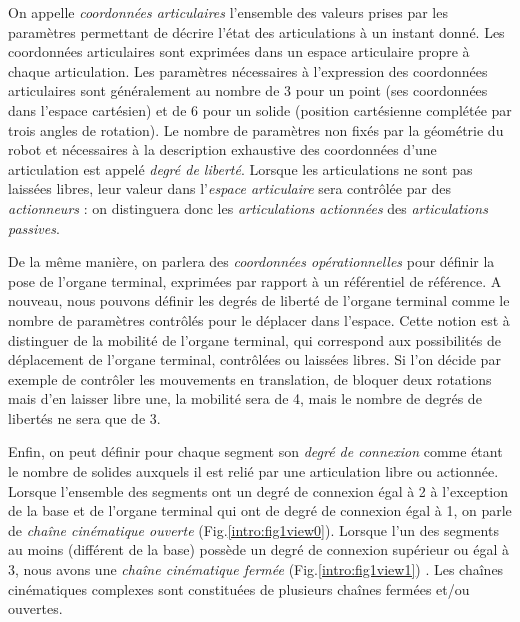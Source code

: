 On appelle {\it coordonnées articulaires} l'ensemble des valeurs prises par les paramètres permettant de décrire l'état des articulations à un instant donné. Les coordonnées articulaires sont exprimées dans un espace articulaire propre à chaque articulation. Les paramètres nécessaires à l'expression des coordonnées articulaires sont généralement au nombre de 3 pour un point (ses coordonnées dans l'espace cartésien) et de 6 pour un solide (position cartésienne complétée par trois angles de rotation). Le nombre de paramètres non fixés par la géométrie du robot et nécessaires à la description exhaustive des coordonnées d'une articulation est appelé {\it degré de liberté}. Lorsque les articulations ne sont pas laissées libres, leur valeur dans l'{\it espace articulaire} sera contr\^olée par des {\it actionneurs} : on distinguera donc les {\it articulations actionnées} des {\it articulations passives}.

De la même manière, on parlera des {\it coordonnées opérationnelles} pour définir la pose de l'organe terminal, exprimées par rapport à un référentiel de référence. A nouveau, nous pouvons définir les degrés de liberté de l'organe terminal comme le nombre de paramètres contr\^olés pour le déplacer dans l'espace. Cette notion est à distinguer de la mobilité de l'organe terminal, qui correspond aux possibilités de déplacement de l'organe terminal, contrôlées ou laissées libres. Si l'on décide par exemple de contr\^oler les mouvements en translation, de bloquer deux rotations mais d'en laisser libre une, la mobilité sera de 4, mais le nombre de degrés de libertés ne sera que de 3.

Enfin, on peut définir pour chaque segment son {\it degré de connexion} comme étant le nombre de solides auxquels il est relié par une articulation libre ou actionnée. Lorsque l'ensemble des segments ont un degré de connexion égal à 2 à l'exception de la base et de l'organe terminal qui ont de degré de connexion égal à 1, on parle de {\it cha\^ine cinématique ouverte} (Fig.\ref{intro:fig1view0}). Lorsque l'un des segments au moins (différent de la base) possède un degré de connexion supérieur ou égal à 3, nous avons une {\it cha\^ine cinématique fermée} (Fig.\ref{intro:fig1view1}) \cite{journals/gosselin1989}. Les cha\^ines cinématiques complexes sont constituées de plusieurs cha\^ines fermées et/ou ouvertes.

